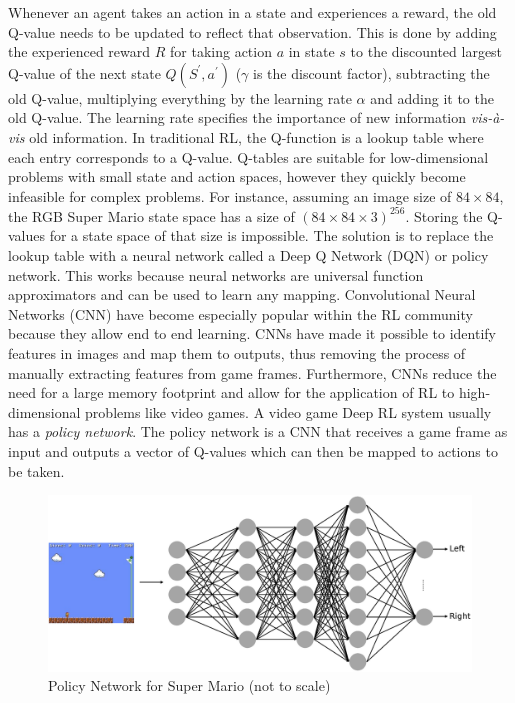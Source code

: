 \documentclass[notitlepage,a4paper,11pt]{article}
\begin{document}
Whenever an agent takes an action in a state and experiences a reward, the old Q-value needs to be updated to reflect that observation. This is done by adding the experienced reward $R$ for taking action $a$ in state $s$ to the discounted largest Q-value of the next state $Q(S^\prime, a^\prime)$ ($\gamma$ is the discount factor), subtracting the old Q-value, multiplying everything by the learning rate $\alpha$ and adding it to the old Q-value. The learning rate specifies the importance of new information \textit{vis-à-vis} old information. In traditional RL, the Q-function is a lookup table where each entry corresponds to a Q-value. Q-tables are suitable for low-dimensional problems with small state and action spaces, however they quickly become infeasible for complex problems. For instance, assuming an image size of $84 \times 84$, the RGB Super Mario state space has a size of $(84 \times 84 \times 3)^{256}$. Storing the Q-values for a state space of that size is impossible. The solution is to replace the lookup table with a neural network called a Deep Q Network (DQN) or policy network. This works because neural networks are universal function approximators and can be used to learn any mapping. Convolutional Neural Networks (CNN) have become especially popular within the RL community because they allow end to end learning. CNNs have made it possible to identify features in images and map them to outputs, thus removing the process of manually extracting features from game frames. Furthermore, CNNs reduce the need for a large memory footprint and allow for the application of RL to high-dimensional problems like video games. A video game Deep RL system usually has a \textit{policy network}. The policy network is a CNN that receives a game frame as input and outputs a vector of Q-values which can then be mapped to actions to be taken.

\begin{figure}[!htb]
\centering
\includegraphics[trim={0 2cm 0 2cm},clip,width=.75\linewidth]{figs/deep_rl_video_game.eps}
\caption{Policy Network for Super Mario (not to scale)} \label{fig:2}
\end{figure}
\end{document}
